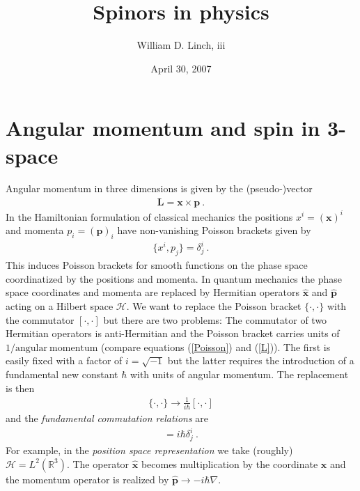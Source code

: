 \documentclass[12pt]{article}
\title{Spinors in physics}
\author{William D. Linch, {\sc iii}}
\date{April 30, 2007}                                           %
\begin{document}
\maketitle


\section{Angular momentum and spin in 3-space}

Angular momentum in three dimensions is given by the (pseudo-)vector
\begin{eqnarray}
\label{L}
\mathbf L=\mathbf x \times \mathbf p~.
\end{eqnarray}
In the Hamiltonian formulation of classical mechanics the positions $x^i=(\mathbf x)^i$ and momenta $p_i =(\mathbf p)_i$ have non-vanishing Poisson brackets given by
\begin{eqnarray}
\label{Poisson}
\{ x^i , p_j\}=\delta_j^i~.
\end{eqnarray}
This induces Poisson brackets for smooth functions on the phase space coordinatized by the positions and momenta. In quantum mechanics the phase space coordinates and momenta are replaced by Hermitian operators $\hat {\mathbf x}$ and $\hat {\mathbf p}$ acting on a Hilbert space $\mathcal H$. We want to replace the Poisson bracket  $\{\cdot, \cdot \}$ with the commutator $[\cdot, \cdot]$ but there are two problems: The commutator of two Hermitian operators is anti-Hermitian and the Poisson bracket carries units of $1/\mathrm{angular~momentum}$ (compare equations (\ref{Poisson}) and (\ref{L})). The first is easily fixed with a factor of $i=\sqrt{-1}$ but the latter requires the introduction of a fundamental new constant $\hbar$ with units of angular momentum. The replacement is then
\begin{eqnarray}
\{\cdot , \cdot \}\to \frac 1{i\hbar} [\cdot, \cdot]
\end{eqnarray}
and the {\em fundamental commutation relations} are 
\begin{eqnarray}
[ x^i , p_j]=i\hbar \delta_j^i~.
\end{eqnarray}
For example, in the {\em position space representation} we take (roughly) $\mathcal H=L^2(\mathbb R^3)$. The operator $\hat {\mathbf x}$ becomes multiplication by the coordinate $\mathbf x$ and the momentum operator is realized by $\hat {\mathbf p}\to -i\hbar \nabla$.
\end{document}
